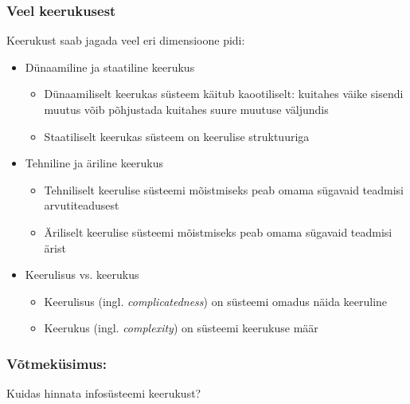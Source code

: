 \begin{frame}[fragile]
  \frametitle{Veel keerukusest}
	Keerukust saab jagada veel eri dimensioone pidi:
	
	\begin{itemize}
		\item Dünaamiline ja staatiline keerukus
			\begin{itemize}
				\item Dünaamiliselt keerukas süsteem käitub kaootiliselt: kuitahes väike sisendi muutus võib põhjustada kuitahes suure muutuse väljundis
				\item Staatiliselt keerukas süsteem on keerulise struktuuriga
			\end{itemize} 
		\item Tehniline ja äriline keerukus
			\begin{itemize}
				\item Tehniliselt keerulise süsteemi mõistmiseks peab omama sügavaid teadmisi arvutiteadusest  
				\item Äriliselt keerulise süsteemi mõistmiseks peab omama sügavaid teadmisi ärist
			\end{itemize} 
		\item Keerulisus vs. keerukus
			\begin{itemize}
				\item Keerulisus (ingl. \emph{complicatedness}) on süsteemi omadus näida keeruline
				\item Keerukus (ingl. \emph{complexity}) on süsteemi keerukuse määr
			\end{itemize} 
	\end{itemize}
\end{frame}

\begin{frame}[fragile]
	\frametitle{Võtmeküsimus:}
	\vfill
	\begin{center}
		Kuidas hinnata infosüsteemi keerukust?  
	\end{center}
	\vfill
\end{frame}



